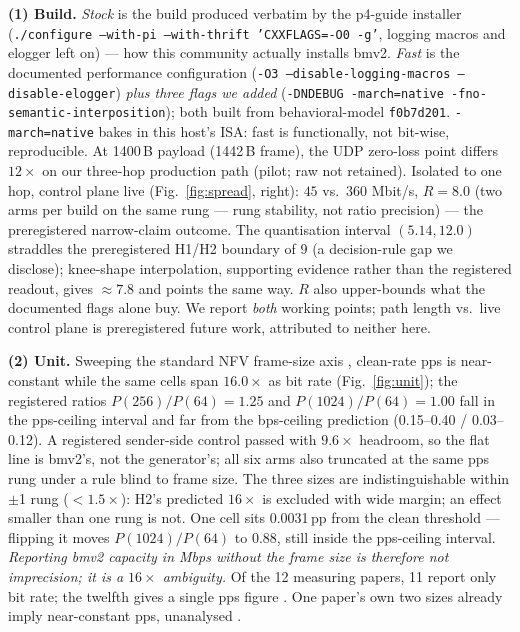 \documentclass[sigconf,nonacm,anonymous]{acmart}
\begin{document}
\textbf{(1) Build.} \emph{Stock} is the build produced verbatim by the
p4-guide installer \cite{p4guide}
(\texttt{./configure --with-pi --with-thrift 'CXXFLAGS=-O0 -g'}, logging
macros and elogger left on) --- how this community actually installs bmv2.
\emph{Fast} is the documented performance configuration
(\texttt{-O3 --disable-logging-macros --disable-elogger}) \emph{plus three
flags we added} (\texttt{-DNDEBUG -march=native -fno-semantic-interposition});
both built from behavioral-model \texttt{f0b7d201}. \texttt{-march=native}
bakes in this host's ISA: fast is functionally, not bit-wise, reproducible.
At 1400\,B payload (1442\,B frame), the UDP zero-loss point differs
$12\times$ on our three-hop production path (pilot; raw not retained).
Isolated to one hop, control plane live (Fig.~\ref{fig:spread}, right): $45$ vs.\
$360$ Mbit/s, $R{=}8.0$ (two arms per build on the same rung --- rung
stability, not ratio precision) --- the preregistered narrow-claim outcome. The quantisation interval $(5.14,12.0)$ straddles the preregistered
H1/H2 boundary of 9 (a decision-rule gap we disclose); knee-shape
interpolation, supporting evidence rather than the registered readout, gives
${\approx}7.8$ and points the same way. $R$ also
upper-bounds what the documented flags alone buy. We report \emph{both}
working points; path length vs.\ live control plane is preregistered future
work, attributed to neither here.

\textbf{(2) Unit.} Sweeping the standard NFV frame-size axis
\cite{zhang2021benchmarking}, clean-rate pps is near-constant while the same
cells span $16.0\times$ as bit rate (Fig.~\ref{fig:unit}); the registered
ratios $P(256)/P(64){=}1.25$ and $P(1024)/P(64){=}1.00$ fall in the
pps-ceiling interval and far from the bps-ceiling prediction (0.15--0.40 /
0.03--0.12). A registered sender-side control passed with $9.6\times$
headroom, so the flat line is bmv2's, not the generator's; all six arms also
truncated at the same pps rung under a rule blind to frame size. The three
sizes are indistinguishable within $\pm$1 rung ($<1.5\times$): H2's predicted
$16\times$ is excluded with wide margin; an effect smaller than one rung is
not. One cell sits 0.0031\,pp from the clean threshold --- flipping it moves
$P(1024)/P(64)$ to 0.88, still inside the pps-ceiling interval.
\emph{Reporting bmv2 capacity in Mbps without the frame size is therefore not
imprecision; it is a $16\times$ ambiguity.} Of the 12 measuring papers, 11
report only bit rate; the twelfth gives a single pps figure
\cite{kohler2018p4cep}. One paper's own two sizes already imply near-constant
pps, unanalysed \cite{hasnaa2023tssa}.
\end{document}
